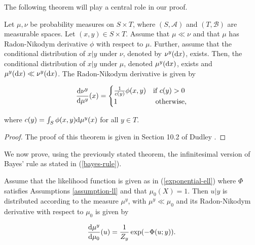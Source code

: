The following theorem will play a central role in our proof.

\begin{theorem}
  \label{duley}
  Let $\mu, \nu$ be probability measures on $S \times T$, where $(S, \mathcal{A})$ and $(T, \mathcal{B})$ are measurable spaces. Let $(x, y) \in S \times T$. Assume that $\mu \ll \nu$ and that $\mu$ has Radon-Nikodym derivative $\phi$ with respect to $\mu$. Further, assume that the conditional distribution of $x|y$ under $\nu$, denoted by $\nu^y(\text{d} x)$, exists. Then, the conditional distribution of $x|y$ under $\mu$, denoted $\mu^y(\text{d} x)$, exists and $\mu^y(\text{d} x) \ll \nu^y(\text{d} x)$. The Radon-Nikodym derivative is given by

  \begin{equation}
    \frac{\text{d} \nu^y}{\text{d} \mu^y}(x) =  \begin{cases}
      \frac1{c(y)}\phi(x,y) & \text{if $c(y) > 0$}\\
      1 & \text{ otherwise,}
    \end{cases}  
  \end{equation}

  where $c(y) = \int_{S}\phi(x,y)\text{d} \mu^y(x)$ for all $y \in T$.
\end{theorem}

\begin{proof}
  The proof of this theorem is given in Section 10.2 of Dudley \cite{dudley_2002}.
\end{proof}

We now prove, using the previously stated theorem, the infinitesimal version of Bayes' rule as stated in (\ref{bayes-rule}).

\begin{theorem}
  Assume that the likelihood function is given as in (\ref{exponential-ell}) where $\Phi$ satisfies Assumptions \ref{assumption-ll} and that $\mu_0(X) = 1$. Then $u | y$ is distributed according to the measure $\mu^y$, with $\mu^y \ll \mu_0$ and its Radon-Nikodym derivative with respect to $\mu_0$ is given by

  \begin{equation}
    \frac{\text{d} \mu^y}{\text{d} \mu_0}(u) = \frac1{Z_y}\exp(-\Phi(u;y)).
  \end{equation}
\end{theorem}

